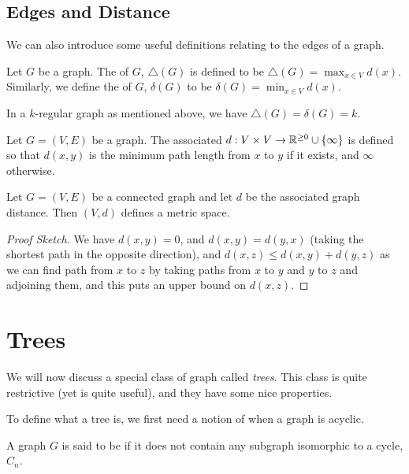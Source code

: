 \documentclass[a4paper]{scrreprt}
\begin{document}
\subsection{Edges and Distance}

We can also introduce some useful definitions relating to the edges of a graph.

\begin{definition}
	Let $G$ be a graph. The  of $G$, $\triangle(G)$ is defined to be $\triangle(G) = \max_{x \in V} d(x)$. Similarly, we define the  of $G$, $\delta(G)$ to be $\delta(G) = \min_{x \in V} d(x)$.
\end{definition}

In a $k$-regular graph as mentioned above, we have $\triangle(G) = \delta(G) = k$.

\begin{definition}
Let $G = (V, E)$ be a graph. The associated  $d: V \times V \rightarrow \mathbb{R}^{\geq 0} \cup \{ \infty \}$ is defined so that $d(x, y)$ is the minimum path length from $x$ to $y$ if it exists, and $\infty$ otherwise.
\end{definition}

\begin{proposition}
	Let $G = (V, E)$ be a connected graph and let $d$ be the associated graph distance. Then $(V, d)$ defines a metric space.
\end{proposition}
\begin{proof}[Proof Sketch]
	We have $d(x, y) = 0$, and $d(x, y) = d(y, x)$ (taking the shortest path in the opposite direction), and $d(x, z) \leq d(x, y) + d(y, z)$ as we can find path from $x$ to $z$ by taking paths from $x$ to $y$ and $y$ to $z$ and adjoining them, and this puts an upper bound on $d(x, z)$.
\end{proof}

\section{Trees}

We will now discuss a special class of graph called \emph{trees}.
This class is quite restrictive (yet is quite useful), and they have some nice properties.

To define what a tree is, we first need a notion of when a graph is acyclic.

\begin{definition}[Acyclic]
	A graph $G$ is said to be  if it does not contain any subgraph isomorphic to a cycle, $C_n$.
\end{definition}
\end{document}
